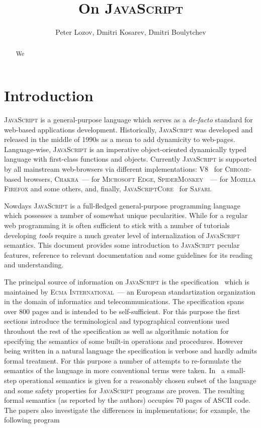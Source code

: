 \documentclass{article}
\date{}
\newcommand{\js}{\textsc{JavaScript}\xspace}
\newcommand{\ecma}{\textsc{Ecma International}\xspace}
\begin{document}
\title{On \js}

\author{Peter Lozov, Dmitri Kosarev, Dmitri Boulytchev}

\maketitle

\begin{abstract}
We 
\end{abstract}

\section{Introduction}

\js is a general-purpose language which serves as a \emph{de-facto} standard for web-based
applications development. Historically, \js was developed and released in the middle of 1990s
as a mean to add dynamicity to web-pages. Language-wise, \js is an imperative object-oriented
dynamically typed language with first-class functions and objects. Currently \js is
supported by all mainstream web-browsers via different implementations: \textsc{V8}~\cite{V8}
for \textsc{Chrome}-based browsers, \textsc{Chakra}~--- for \textsc{Microsoft Edge},
\textsc{SpiderMonkey}~\cite{SpiderMonkey}~--- for \textsc{Mozilla Firefox} and some others, and,
finally, \textsc{JavaScriptCore}~\cite{JavaScriptCore} for \textsc{Safari}.

Nowdays \js is a full-fledged general-purpose programming language which possesses a number of
somewhat unique pecularities. While for a regular web programming it is often sufficient to
stick with a number of tutorials~\cite{Tutorial} developing \emph{tools} require a
much greater level of internalization of \js semantics. This document provides some
introduction to \js pecular features, reference to relevant documentation and
some guidelines for its reading and understanding.

The principal source of information on \js is the specification~\cite{Spec} which is maintained by
\ecma~--- an European standartization organization in the domain of informatics and telecommunications.
The specification spans over 800 pages and is intended to be self-sufficient. For this purpose
the first sections introduce the terminological and typographical conventions used throuhout the rest of
the specification as well as algorithmic notation for specifying the semantics of some built-in operations
and procedures. However being written in a natural language the specification is verbose and hardly admits
formal treatment. For this purpose a number of attempts to re-formulate the semantics of the language
in more conventional terms were taken. In~\cite{Operational1,Operational2} a small-step operational
semantics is given for a reasonably chosen subset of the language and some safety properties for
\js programs are proven. The resulting formal semantics (as reported by the authors) occupies 70 pages of
ASCII code. The papers also investigate the differences in implementations; for example, the following
program
\end{document}
